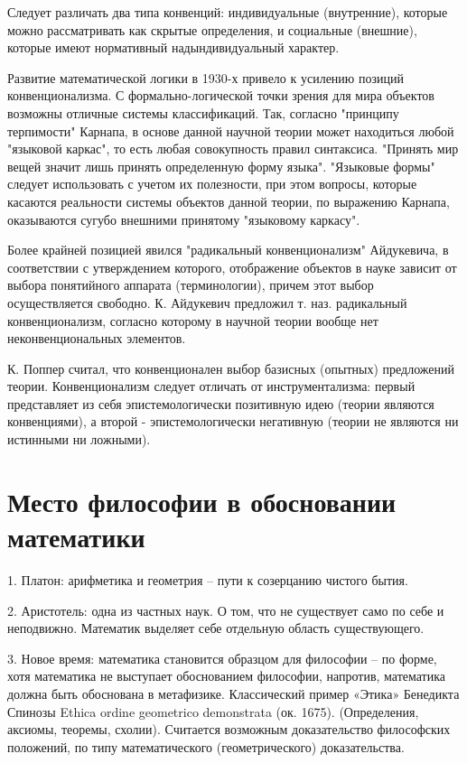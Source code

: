 \documentclass[12pt, specialist, subf, substylefile = spbu.rtx]{disser}
\begin{document}
Следует различать два типа конвенций: индивидуальные (внутренние), которые можно рассматривать как скрытые определения, и социальные (внешние), которые имеют нормативный надындивидуальный характер.

Развитие математической логики в 1930-х привело к усилению позиций конвенционализма. С формально-логической точки зрения для мира объектов возможны отличные системы классификаций. Так, согласно "принципу терпимости" Карнапа, в основе данной научной теории может находиться любой "языковой каркас", то есть любая совокупность правил синтаксиса. "Принять мир вещей значит лишь принять определенную форму языка". "Языковые формы" следует использовать с учетом их полезности, при этом вопросы, которые касаются реальности системы объектов данной теории, по выражению Карнапа, оказываются сугубо внешними принятому "языковому каркасу".

Более крайней позицией явился "радикальный конвенционализм" Айдукевича, в соответствии с утверждением которого, отображение объектов в науке зависит от выбора понятийного аппарата (терминологии), причем этот выбор осуществляется свободно. К. Айдукевич предложил т. наз. радикальный конвенционализм, согласно которому в научной теории вообще нет неконвенциональных элементов.

К. Поппер считал, что конвенционален выбор базисных (опытных) предложений теории. Конвенционализм следует отличать от инструментализма: первый представляет из себя эпистемологически позитивную идею (теории являются конвенциями), а второй - эпистемологически негативную (теории не являются ни истинными ни ложными).

\section{Место философии в обосновании математики}
1. Платон: арифметика и геометрия – пути к созерцанию чистого бытия.

2. Аристотель: одна из частных наук. О том, что не существует само по себе и неподвижно. Математик выделяет себе отдельную область существующего.

3. Новое время: математика становится образцом для философии – по форме, хотя математика не выступает обоснованием философии, напротив, математика должна быть обоснована в метафизике. Классический пример «Этика» Бенедикта Спинозы Ethica ordine geometrico demonstrata (ок. 1675). (Определения, аксиомы, теоремы, схолии). Считается возможным доказательство философских положений, по типу математического (геометрического) доказательства.
\end{document}
